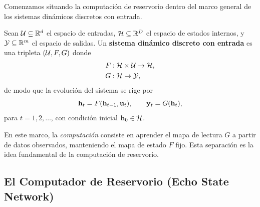 Comenzamos situando la computación de reservorio dentro del marco
general de los sistemas dinámicos discretos con entrada.

\begin{definition}
\label{def:sistema_dinamico_entrada}
Sean $\mathcal{U} \subseteq \mathbb{R}^d$ el espacio de entradas,
$\mathcal{H} \subseteq \mathbb{R}^D$ el espacio de estados internos, y
$\mathcal{Y} \subseteq \mathbb{R}^m$ el espacio de salidas.  Un
\textbf{sistema dinámico discreto con entrada} es una tripleta
$(\mathcal{U}, F, G)$ donde
\begin{align}
    F &: \mathcal{H} \times \mathcal{U} \to \mathcal{H}, \label{eq:mapa_estado}\\
    G &: \mathcal{H} \to \mathcal{Y}, \label{eq:mapa_lectura}
\end{align}
de modo que la evolución del sistema se rige por
\begin{equation}
    \mathbf{h}_t = F(\mathbf{h}_{t-1}, \mathbf{u}_t), \qquad
    \mathbf{y}_t = G(\mathbf{h}_t),
    \label{eq:evolucion_general}
\end{equation}
para $t = 1, 2, \ldots$, con condición inicial
$\mathbf{h}_0 \in \mathcal{H}$.
\end{definition}

En este marco, la \emph{computación} consiste en aprender el mapa
de lectura $G$ a partir de datos observados, manteniendo el mapa de
estado $F$ fijo.  Esta separación es la idea fundamental de la
computación de reservorio.

\subsection{El Computador de Reservorio (Echo State Network)}
\label{subsec:esn_definicion}

